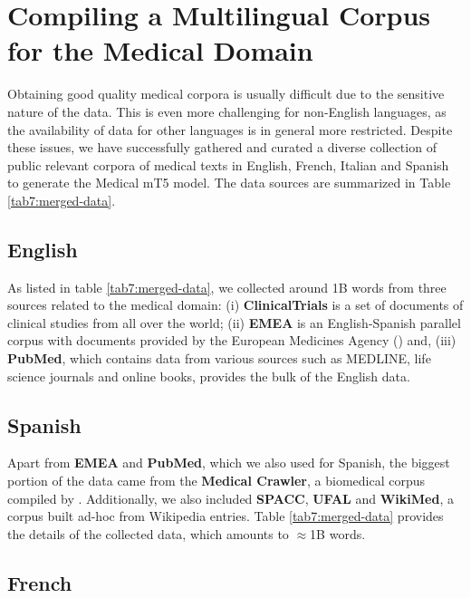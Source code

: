 \section{Compiling a Multilingual Corpus for the Medical Domain}\label{sec7:corpus}



Obtaining good quality medical corpora is usually difficult due to the sensitive nature of the data. This is even more challenging for non-English languages, as the availability of data for other languages is in general more restricted. Despite these issues, we have successfully gathered and curated a diverse collection of public relevant corpora of medical texts in English, French, Italian and Spanish to generate the Medical mT5 model. The data sources are summarized in Table \ref{tab7:merged-data}.



\subsection{English}

As listed in table \ref{tab7:merged-data}, we collected around 1B words from three sources related to the medical domain: (i) \textbf{ClinicalTrials} is a set of documents of clinical studies from all over the world; (ii) \textbf{EMEA} is an English-Spanish parallel corpus with documents provided by the European Medicines Agency (\cite{TIEDEMANN12.463}) and, (iii) \textbf{PubMed}, which contains data from various sources such as MEDLINE, life science journals and online books, provides the bulk of the English data.


\subsection{Spanish}

Apart from \textbf{EMEA} and \textbf{PubMed}, which we also used for Spanish, the biggest portion of the data came from the \textbf{Medical Crawler}, a biomedical corpus compiled by \citet{carrino-etal-2022-pretrained}. Additionally, we also included \textbf{SPACC}, \textbf{UFAL} and \textbf{WikiMed}, a corpus built ad-hoc from Wikipedia entries. Table \ref{tab7:merged-data} provides the details of the collected data, which amounts to $\approx$1B words.

\subsection{French}

